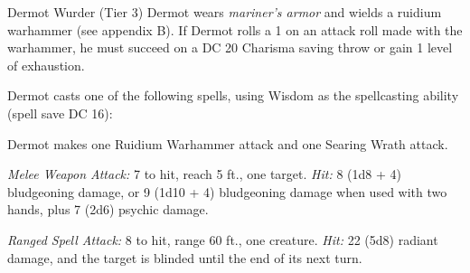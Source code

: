 \documentclass[10pt,a4paper,twoside,bg=print,twocolumn,openany,nodeprecatedcode]{dndbook}
\begin{document}
\begin{DndMonster}[float=t]{Dermot Wurder (Tier 3)}
\DndMonsterBasics[
armor-class = {20 (plate armor)},
hit-points = {\DndDice{17d6 + 34}},
speed = {30 ft., swim 30 ft. \textit{(mariner's armor)}}
]
\DndMonsterAbilityScores[
 str = 18,
 dex = 12,
 con = 14,
 int = 10,
 wis = 20,
 cha = 10
]
\DndMonsterDetails[
saving-throws = {Wis +8, Cha +3},
skills = {Medicine +8, Religion +3, Survival +8},
senses = {darkvision 60 ft., passive perception 15},
languages = {Common, Goblin, Orc},
challenge = 8,
]
Dermot wears \textit{mariner's armor} and wields a ruidium warhammer (see appendix B). If Dermot rolls a 1 on an attack roll made with the warhammer, he must succeed on a DC 20 Charisma saving throw or gain 1 level of exhaustion.

Dermot casts one of the following spells, using Wisdom as the spellcasting ability (spell save DC 16):
\begin{DndMonsterSpells}
\end{DndMonsterSpells}
Dermot makes one Ruidium Warhammer attack and one Searing Wrath attack.

\textsl{Melee Weapon Attack:} 7 to hit, reach 5 ft., one target. \textsl{Hit:} 8 (1d8 + 4) bludgeoning damage, or 9 (1d10 + 4) bludgeoning damage when used with two hands, plus 7 (2d6) psychic damage.

\textsl{Ranged Spell Attack:} 8 to hit, range 60 ft., one creature. \textsl{Hit:} 22 (5d8) radiant damage, and the target is blinded until the end of its next turn.

\end{DndMonster}


\clearpage
\end{document}
